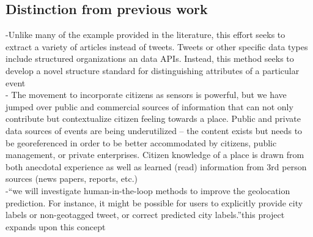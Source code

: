 \subsection{Distinction from previous work}
-{\color{purple}Unlike many of the example provided in the literature, this effort seeks to extract a variety of articles instead of tweets.  Tweets or other specific data types include structured organizations an data APIs. Instead, this method seeks to develop a novel structure standard for distinguishing attributes of a particular event \cite{Snyder2019}}\\
- {\color{purple}The movement to incorporate citizens as sensors is powerful, but we have jumped over public and commercial sources of information that can not only contribute but contextualize citizen feeling towards a place. Public and private data sources of events are being underutilized -- the content exists but needs to be georeferenced in order to be better accommodated by citizens, public management, or private enterprises. Citizen knowledge of a place is drawn from both anecdotal experience as well as learned (read) information from 3rd person sources (news papers, reports, etc.)}\\
-{\color{orange}“we will investigate human-in-the-loop methods to improve the geolocation prediction. For instance, it might be possible for users to explicitly provide city labels or non-geotagged tweet, or correct predicted city labels.”\cite{Snyder2019}}{\color{purple}this project expands upon this concept}\\

